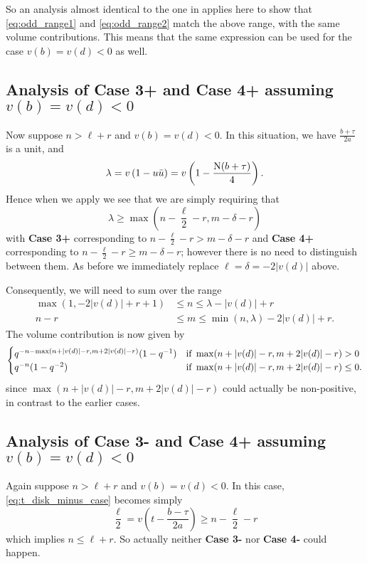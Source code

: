 So an analysis almost identical to the one in  applies here
to show that \eqref{eq:odd_range1} and \eqref{eq:odd_range2}
match the above range, with the same volume contributions.
This means that the same expression can be used for the case $v(b) = v(d) < 0$ as well.

\subsection{Analysis of Case 3\ts+ and Case 4\ts+ assuming $v(b) = v(d) < 0$}
Now suppose $n > \ell + r$ and $v(b) = v(d) < 0$.
In this situation, we have $\frac{b+\tau}{2a}$ is a unit, and
\[ \lambda =v\left( 1 - u \bar u \right) =  v\left( 1 - \frac{\operatorname{N}(b+\tau)}{4} \right). \]
Hence when we apply  we see that we are simply requiring that
\[ \lambda \ge \max\left( n - \frac{\ell}{2} - r, m - \delta - r \right) \]
with \textbf{Case 3\ts+} corresponding to
$n - \frac{\ell}{2} - r > m - \delta - r$
and \textbf{Case 4\ts+} corresponding to
$n - \frac{\ell}{2} - r \ge m - \delta - r$;
however there is no need to distinguish between them.
As before we immediately replace $\ell = \delta = -2|v(d)|$ above.

Consequently, we will need to sum over the range
\begin{equation}
  \begin{aligned}
    \max(1, -2|v(d)| + r + 1) &\leq n \leq \lambda - |v(d)| + r \\
    n - r &\leq m \leq \min(n, \lambda) - 2|v(d)| + r.
  \end{aligned}
  \label{eq:ell_neg_34_range}
\end{equation}
The volume contribution is now given by
\begin{equation}
  \begin{cases}
    q^{-n - \max(n+|v(d)|-r, m+2|v(d)|-r)} (1 - q^{-1}) &\text{if } \max(n+|v(d)|-r, m+2|v(d)|-r) > 0 \\
    q^{-n} (1 - q^{-2}) &\text{if } \max(n+|v(d)|-r, m+2|v(d)|-r) \le 0.
  \end{cases}
  \label{eq:ell_neg_34_vol}
\end{equation}
since $\max(n+|v(d)|-r, m+2|v(d)|-r)$ could actually be non-positive,
in contrast to the earlier cases.

\subsection{Analysis of Case 3\ts- and Case 4\ts+ assuming $v(b) = v(d) < 0$}
Again suppose $n > \ell + r$ and $v(b) = v(d) < 0$.
In this case, \eqref{eq:t_disk_minus_case} becomes simply
\[ \frac{\ell}{2} = v\left( t - \frac{b-\tau}{2a} \right) \ge n - \frac{\ell}{2} - r \]
which implies $n \le \ell + r$.
So actually neither \textbf{Case 3\ts-} nor \textbf{Case 4\ts-} could happen.
